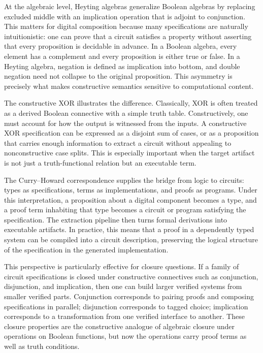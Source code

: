 \documentclass[11pt]{article}
\begin{document}
At the algebraic level, Heyting algebras generalize Boolean algebras by replacing excluded middle with an implication operation that is adjoint to conjunction. This matters for digital composition because many specifications are naturally intuitionistic: one can prove that a circuit satisfies a property without asserting that every proposition is decidable in advance. In a Boolean algebra, every element has a complement and every proposition is either true or false. In a Heyting algebra, negation is defined as implication into bottom, and double negation need not collapse to the original proposition. This asymmetry is precisely what makes constructive semantics sensitive to computational content.

The constructive XOR illustrates the difference. Classically, XOR is often treated as a derived Boolean connective with a simple truth table. Constructively, one must account for how the output is witnessed from the inputs. A constructive XOR specification can be expressed as a disjoint sum of cases, or as a proposition that carries enough information to extract a circuit without appealing to nonconstructive case splits. This is especially important when the target artifact is not just a truth-functional relation but an executable term.

The Curry--Howard correspondence supplies the bridge from logic to circuits: types as specifications, terms as implementations, and proofs as programs. Under this interpretation, a proposition about a digital component becomes a type, and a proof term inhabiting that type becomes a circuit or program satisfying the specification. The extraction pipeline then turns formal derivations into executable artifacts. In practice, this means that a proof in a dependently typed system can be compiled into a circuit description, preserving the logical structure of the specification in the generated implementation.

This perspective is particularly effective for closure questions. If a family of circuit specifications is closed under constructive connectives such as conjunction, disjunction, and implication, then one can build larger verified systems from smaller verified parts. Conjunction corresponds to pairing proofs and composing specifications in parallel; disjunction corresponds to tagged choice; implication corresponds to a transformation from one verified interface to another. These closure properties are the constructive analogue of algebraic closure under operations on Boolean functions, but now the operations carry proof terms as well as truth conditions.
\end{document}
